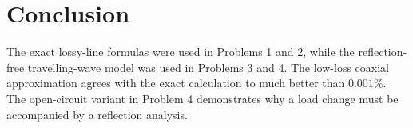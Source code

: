 \documentclass[12pt,a4paper]{article}
\begin{document}

\section*{Conclusion}
The exact lossy-line formulas were used in Problems 1 and 2, while the
reflection-free travelling-wave model was used in Problems 3 and 4.  The
low-loss coaxial approximation agrees with the exact calculation to much
better than $0.001\%$.  The open-circuit variant in Problem 4 demonstrates why
a load change must be accompanied by a reflection analysis.
\end{document}
